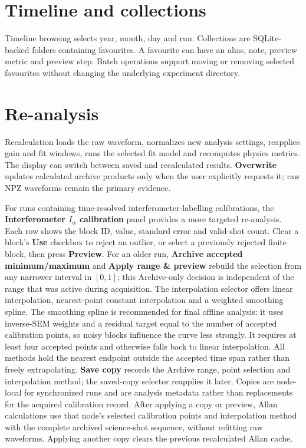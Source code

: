 \documentclass[11pt,oneside,openany]{book}
\newcommand{\ui}[1]{\textbf{#1}}
\begin{document}
\section{Timeline and collections}
Timeline browsing selects year, month, day and run. Collections are SQLite-backed folders
containing favourites. A favourite can have an alias, note, preview metric and preview
step. Batch operations support moving or removing selected favourites without changing the
underlying experiment directory.

\section{Re-analysis}
Recalculation loads the raw waveform, normalizes new analysis settings, reapplies gain and
fit windows, runs the selected fit model and recomputes physics metrics. The display can
switch between saved and recalculated results. \ui{Overwrite} updates calculated archive
products only when the user explicitly requests it; raw NPZ waveforms remain the primary
evidence.

For runs containing time-resolved interferometer-labelling calibrations, the
\ui{Interferometer $I_\alpha$ calibration} panel provides a more targeted re-analysis.  Each
row shows the block ID, value, standard error and valid-shot count.  Clear a block's
\ui{Use} checkbox to reject an outlier, or select a previously rejected finite block, then
press \ui{Preview}.  For an older run, \ui{Archive accepted minimum/maximum} and
\ui{Apply range \& preview} rebuild the selection from any narrower interval in $[0,1]$;
this Archive-only decision is independent of the range that was active during acquisition.
The interpolation selector offers linear interpolation, nearest-point
constant interpolation and a weighted smoothing spline.  The smoothing spline is recommended
for final offline analysis: it uses inverse-SEM weights and a residual target equal to the
number of accepted calibration points, so noisy blocks influence the curve less strongly.
It requires at least four accepted points and otherwise falls back to linear interpolation.
All methods hold the nearest endpoint outside the accepted time span rather than freely
extrapolating.  \ui{Save copy} records the Archive range, point selection and interpolation method;
the saved-copy selector reapplies it later.  Copies are node-local for synchronized runs and
are analysis metadata rather than replacements for the acquired calibration record.
After applying a copy or preview, Allan calculations use that node's selected calibration
points and interpolation method with the complete archived science-shot sequence, without
refitting raw waveforms. Applying another copy clears the previous recalculated Allan cache.
\end{document}
